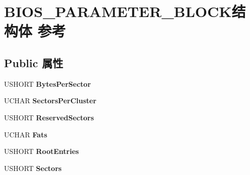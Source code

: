 \hypertarget{struct_b_i_o_s___p_a_r_a_m_e_t_e_r___b_l_o_c_k}{}\section{B\+I\+O\+S\+\_\+\+P\+A\+R\+A\+M\+E\+T\+E\+R\+\_\+\+B\+L\+O\+C\+K结构体 参考}
\label{struct_b_i_o_s___p_a_r_a_m_e_t_e_r___b_l_o_c_k}
\subsection*{Public 属性}
\begin{DoxyCompactItemize}
\item 
\mbox{\label{struct_b_i_o_s___p_a_r_a_m_e_t_e_r___b_l_o_c_k_a1e29eddad55bb995ee882dc879955b45}} 
U\+S\+H\+O\+RT {\bfseries Bytes\+Per\+Sector}
\item 
\mbox{\label{struct_b_i_o_s___p_a_r_a_m_e_t_e_r___b_l_o_c_k_adbc6baf9f355bbade0ee1600249f2930}} 
U\+C\+H\+AR {\bfseries Sectors\+Per\+Cluster}
\item 
\mbox{\label{struct_b_i_o_s___p_a_r_a_m_e_t_e_r___b_l_o_c_k_a1b7929b226ae48a46ad9a02f3301bd7a}} 
U\+S\+H\+O\+RT {\bfseries Reserved\+Sectors}
\item 
\mbox{\label{struct_b_i_o_s___p_a_r_a_m_e_t_e_r___b_l_o_c_k_aaf28052b96048bf15e62b5cb831e1254}} 
U\+C\+H\+AR {\bfseries Fats}
\item 
\mbox{\label{struct_b_i_o_s___p_a_r_a_m_e_t_e_r___b_l_o_c_k_ad64aabf7391373202c121b3c012edcaa}} 
U\+S\+H\+O\+RT {\bfseries Root\+Entries}
\item 
\mbox{\label{struct_b_i_o_s___p_a_r_a_m_e_t_e_r___b_l_o_c_k_a66091d3e1b418344890a2b3b2998d07d}} 
U\+S\+H\+O\+RT {\bfseries Sectors}
\item 
\mbox{\label{struct_b_i_o_s___p_a_r_a_m_e_t_e_r___b_l_o_c_k_a3d0c5b693c8ff45259b156360efd97d6}} 

\end{DoxyCompactItemize}
